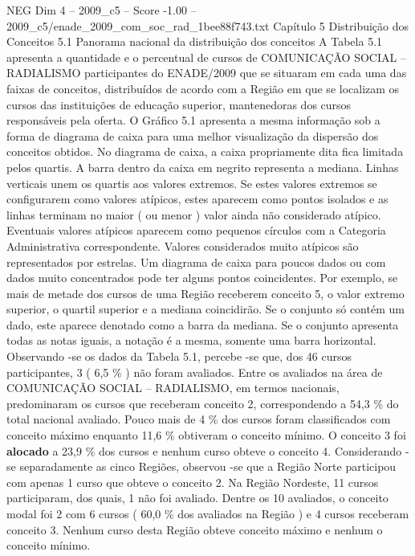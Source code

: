 \begin{textsample}{NEG Dim 4 – 2009\_c5 – Score -1.00 – 2009\_c5/enade\_2009\_com\_soc\_rad\_1bee88f743.txt}  \label{ex:f4_neg_085}
Capítulo 5 Distribuição dos Conceitos 5.1 Panorama nacional da distribuição dos conceitos A Tabela 5.1 apresenta a quantidade e o percentual de cursos de COMUNICAÇÃO SOCIAL – RADIALISMO participantes do ENADE/2009 que se situaram em cada uma das faixas de conceitos, distribuídos de acordo com a Região em que se localizam os cursos das instituições de educação superior, mantenedoras dos cursos responsáveis pela oferta.
O Gráfico 5.1 apresenta a mesma informação sob a forma de diagrama de caixa para uma melhor visualização da dispersão dos conceitos obtidos.
No diagrama de caixa, a caixa propriamente dita fica limitada pelos quartis.
A barra dentro da caixa em negrito representa a mediana.
Linhas verticais unem os quartis aos valores extremos.
Se estes valores extremos se configurarem como valores atípicos, estes aparecem como pontos isolados e as linhas terminam no maior ( ou menor ) valor ainda não considerado atípico.
Eventuais valores atípicos aparecem como pequenos círculos com a Categoria Administrativa correspondente.
Valores considerados muito atípicos são representados por estrelas.
Um diagrama de caixa para poucos dados ou com dados muito concentrados pode ter alguns pontos coincidentes.
Por exemplo, se mais de metade dos cursos de uma Região receberem conceito 5, o valor extremo superior, o quartil superior e a mediana coincidirão.
Se o conjunto só contém um dado, este aparece denotado como a barra da mediana.
Se o conjunto apresenta todas as notas iguais, a notação é a mesma, somente uma barra horizontal.
Observando -se os dados da Tabela 5.1, percebe -se que, dos 46 cursos participantes, 3 ( 6,5 \% ) não foram avaliados.
Entre os avaliados na área de COMUNICAÇÃO SOCIAL – RADIALISMO, em termos nacionais, predominaram os cursos que receberam conceito 2, correspondendo a 54,3 \% do total nacional avaliado.
Pouco mais de 4 \% dos cursos foram classificados com conceito máximo enquanto 11,6 \% obtiveram o conceito mínimo.
O conceito 3 foi \textbf{alocado} a 23,9 \% dos cursos e nenhum curso obteve o conceito 4.
Considerando -se separadamente as cinco Regiões, observou -se que a Região Norte participou com apenas 1 curso que obteve o conceito 2.
Na Região Nordeste, 11 cursos participaram, dos quais, 1 não foi avaliado.
Dentre os 10 avaliados, o conceito modal foi 2 com 6 cursos ( 60,0 \% dos avaliados na Região ) e 4 cursos receberam conceito 3.
Nenhum curso desta Região obteve conceito máximo e nenhum o conceito mínimo.

\end{textsample}
